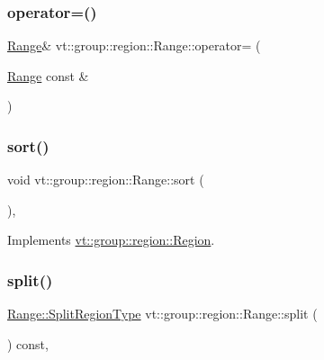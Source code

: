 \subsubsection{\texorpdfstring{operator=()}{operator=()}}
{\footnotesize\ttfamily \hyperlink{structvt_1_1group_1_1region_1_1_range}{Range}\& vt\+::group\+::region\+::\+Range\+::operator= (\begin{DoxyParamCaption}\item[{\hyperlink{structvt_1_1group_1_1region_1_1_range}{Range} const \&}]{ }\end{DoxyParamCaption})\hspace{0.3cm}{\ttfamily [delete]}}

\mbox{\label{structvt_1_1group_1_1region_1_1_range_aa24e09be54662ffd11413803689ed7f8}} 
\subsubsection{\texorpdfstring{sort()}{sort()}}
{\footnotesize\ttfamily void vt\+::group\+::region\+::\+Range\+::sort (\begin{DoxyParamCaption}{ }\end{DoxyParamCaption})\hspace{0.3cm}{\ttfamily [override]}, {\ttfamily [virtual]}}



Implements \hyperlink{structvt_1_1group_1_1region_1_1_region_a169304bf82a87ff958333595bed2603d}{vt\+::group\+::region\+::\+Region}.

\mbox{\label{structvt_1_1group_1_1region_1_1_range_a0d2542edc1fccecc5ba898484f0ccd3f}} 
\subsubsection{\texorpdfstring{split()}{split()}}
{\footnotesize\ttfamily \hyperlink{structvt_1_1group_1_1region_1_1_region_ab8d05c0978c7f38292a9ed5a15498a4b}{Range\+::\+Split\+Region\+Type} vt\+::group\+::region\+::\+Range\+::split (\begin{DoxyParamCaption}{ }\end{DoxyParamCaption}) const\hspace{0.3cm}{\ttfamily [override]}, {\ttfamily [virtual]}}



